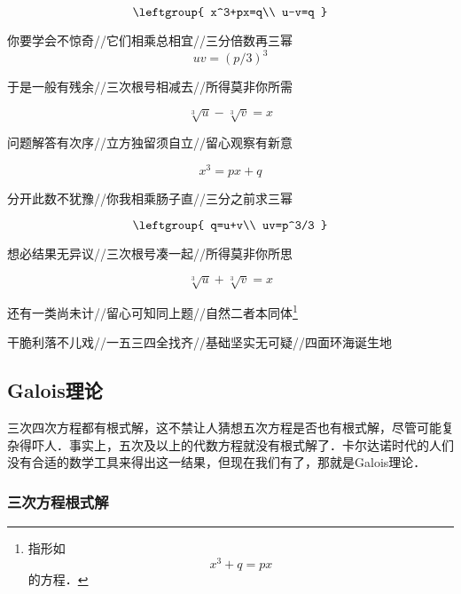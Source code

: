 \begin{equation}
\leftgroup{
    x^3+px=q\\
    u-v=q
}
\end{equation}

你要学会不惊奇//它们相乘总相宜//三分倍数再三幂
\begin{equation}
uv=(p/3)^3
\end{equation}

于是一般有残余//三次根号相减去//所得莫非你所需

\begin{equation}
\sqrt[3]{u}-\sqrt[3]{v}=x
\end{equation}


问题解答有次序//立方独留须自立//留心观察有新意

\begin{equation}
x^3=px+q
\end{equation}

分开此数不犹豫//你我相乘肠子直//三分之前求三幂

\begin{equation}
\leftgroup{
    q=u+v\\
    uv=p^3/3
}
\end{equation}

想必结果无异议//三次根号凑一起//所得莫非你所思

\begin{equation}
\sqrt[3]{u}+\sqrt[3]{v}=x
\end{equation}


还有一类尚未计//留心可知同上题//自然二者本同体\footnote{指形如
\begin{equation}
x^3+q=px
\end{equation}
的方程．}


干脆利落不儿戏//一五三四全找齐//基础坚实无可疑//四面环海诞生地






\subsection{Galois理论}\label{PlyRtS_sub1}

三次四次方程都有根式解，这不禁让人猜想五次方程是否也有根式解，尽管可能复杂得吓人．事实上，五次及以上的代数方程就没有根式解了．卡尔达诺时代的人们没有合适的数学工具来得出这一结果，但现在我们有了，那就是Galois理论．








\subsubsection{三次方程根式解}

